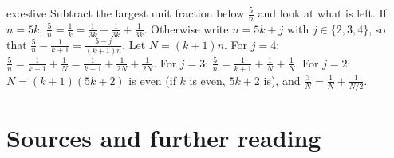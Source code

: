 \begin{solution}{ex:esfive}
\idea Subtract the largest unit fraction below $\frac5n$ and look at what is left.
\writeup If $n=5k$, $\frac5n=\frac1k=\frac1{3k}+\frac1{3k}+\frac1{3k}$. Otherwise write $n=5k+j$ with $j\in\{2,3,4\}$, so that
$\frac5n-\frac1{k+1}=\frac{5-j}{(k+1)n}$. Let $N=(k+1)n$. For $j=4$: $\frac5n=\frac1{k+1}+\frac1N=\frac1{k+1}+\frac1{2N}+\frac1{2N}$. For $j=3$:
$\frac5n=\frac1{k+1}+\frac1N+\frac1N$. For $j=2$: $N=(k+1)(5k+2)$ is even (if $k$ is even, $5k+2$ is), and $\frac3N=\frac1N+\frac1{N/2}$.
\end{solution}

\section*{Sources and further reading}

